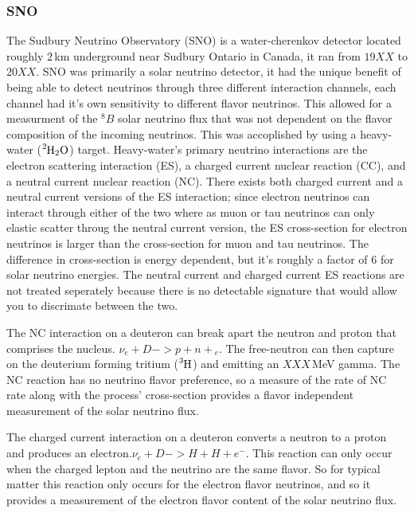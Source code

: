 \subsubsection{SNO}
The Sudbury Neutrino Observatory (SNO) is a water-cherenkov detector located
roughly $2$\,km underground near Sudbury Ontario in Canada, it ran from
$19XX$ to $20XX$.
SNO was primarily a solar neutrino detector, it had the unique benefit of
being able to detect neutrinos through three different interaction channels,
each channel had it's own sensitivity to different flavor neutrinos.
This allowed for a measurment of the $^8B$ solar neutrino flux that was not
dependent on the flavor composition of the incoming neutrinos.
This was accoplished by using a heavy-water ($\ce{^{2}H_{2}O}$) target.
Heavy-water's primary neutrino interactions are the
electron scattering interaction (ES), a charged current nuclear reaction (CC),
and a neutral current nuclear reaction (NC).
There exists both charged current and a neutral current versions of the
ES interaction; since electron neutrinos can interact through either
of the two where as muon or tau neutrinos can only elastic scatter throug the
neutral current version, the ES cross-section for electron neutrinos is larger
than the cross-section for muon and tau neutrinos.
The difference in cross-section is energy dependent, but it's roughly a factor
of 6 for solar neutrino energies. The neutral current and charged current ES reactions
are not treated seperately because there is no detectable signature that
would allow you to discrimate between the two.

The NC interaction on a deuteron can break apart the neutron and proton
that comprises the nucleus. $\nu_{e} + D -> p + n + $\nu$_{e}$.
The free-neutron can then capture on the deuterium forming tritium ($\ce{^{3}H}$)
and emitting an $XXX$\,MeV gamma. %
The NC reaction has no neutrino flavor preference, so a measure of the rate
of NC rate along with the process' cross-section provides a flavor independent
measurement of the solar neutrino flux.

The charged current interaction on a deuteron converts a neutron to a
proton and produces an electron.$\nu_{e} + D -> H + H + e^{-}$.
This reaction can only occur when the charged lepton and the neutrino are the same
flavor. So for typical matter this reaction only occurs for the electron flavor
neutrinos, and so it provides a measurement of the electron flavor content
of the solar neutrino flux.

